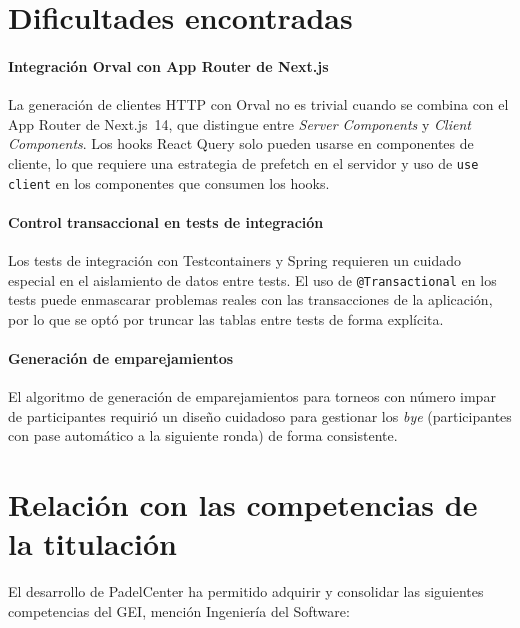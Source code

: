 \section{Dificultades encontradas}
\label{sec:dificultades}

\paragraph{Integración Orval con App Router de Next.js} La generación de clientes
HTTP con Orval no es trivial cuando se combina con el App Router de Next.js~14,
que distingue entre \textit{Server Components} y \textit{Client Components}.
Los hooks React Query solo pueden usarse en componentes de cliente, lo que
requiere una estrategia de prefetch en el servidor y uso de \texttt{use client}
en los componentes que consumen los hooks.

\paragraph{Control transaccional en tests de integración} Los tests de integración
con Testcontainers y Spring requieren un cuidado especial en el aislamiento de
datos entre tests. El uso de \texttt{@Transactional} en los tests puede enmascarar
problemas reales con las transacciones de la aplicación, por lo que se optó por
truncar las tablas entre tests de forma explícita.

\paragraph{Generación de emparejamientos} El algoritmo de generación de
emparejamientos para torneos con número impar de participantes requirió un
diseño cuidadoso para gestionar los \textit{bye} (participantes con pase
automático a la siguiente ronda) de forma consistente.

\section{Relación con las competencias de la titulación}
\label{sec:competencias}

El desarrollo de PadelCenter ha permitido adquirir y consolidar las siguientes
competencias del GEI, mención Ingeniería del Software:

